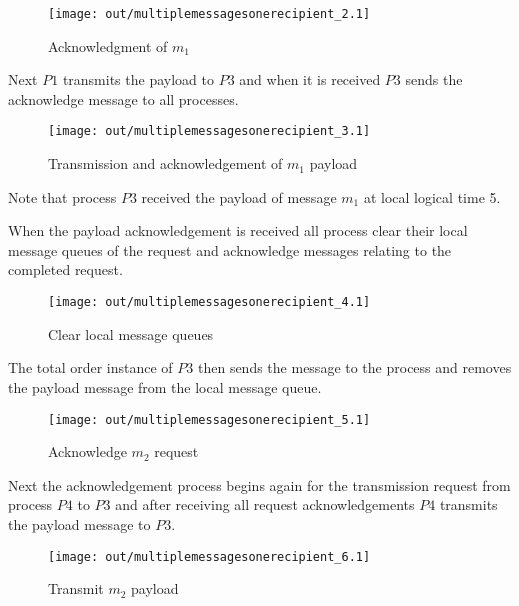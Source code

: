 \documentclass[twocolumn]{article}
\begin{document}
\begin{figure}[h!]
  \centering
  \texttt{[image: out/multiplemessagesonerecipient\_2.1]}
  \caption{Acknowledgment of $m_{1}$}
  \label{fig:multiplemessagesonerecipient_2}
\end{figure}
\FloatBarrier

Next $P1$ transmits the payload to $P3$ and when it is received $P3$ sends the
acknowledge message to all processes.

\begin{figure}[h!]
  \centering
  \texttt{[image: out/multiplemessagesonerecipient\_3.1]}
  \caption{Transmission and acknowledgement of $m_{1}$ payload}
  \label{fig:multiplemessagesonerecipient_3}
\end{figure}
\FloatBarrier

Note that process $P3$ received the payload of message $m_{1}$ at local logical
time 5.

When the payload acknowledgement is received all process clear their local
message queues of the request and acknowledge messages relating to the completed
request.

\begin{figure}[h!]
  \centering
  \texttt{[image: out/multiplemessagesonerecipient\_4.1]}
  \caption{Clear local message queues}
  \label{fig:multiplemessagesonerecipient_4}
\end{figure}
\FloatBarrier

The total order instance of $P3$ then sends the message to the process and
removes the payload message from the local message queue.

\begin{figure}[h!]
  \centering
  \texttt{[image: out/multiplemessagesonerecipient\_5.1]}
  \caption{Acknowledge $m_{2}$ request}
  \label{fig:multiplemessagesonerecipient_5}
\end{figure}
\FloatBarrier

Next the acknowledgement process begins again for the transmission request
from process $P4$ to $P3$ and after receiving all request acknowledgements $P4$
transmits the payload message to $P3$.

\begin{figure}[h!]
  \centering
  \texttt{[image: out/multiplemessagesonerecipient\_6.1]}
  \caption{Transmit $m_{2}$ payload}
  \label{fig:multiplemessagesonerecipient_6}
\end{figure}
\FloatBarrier
\end{document}
